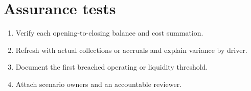 \documentclass[11pt]{article}
\begin{document}
\section{Assurance tests}
\begin{enumerate}[leftmargin=*,itemsep=5pt]
\item Verify each opening-to-closing balance and cost summation.
\item Refresh with actual collections or accruals and explain variance by driver.
\item Document the first breached operating or liquidity threshold.
\item Attach scenario owners and an accountable reviewer.
\end{enumerate}
\end{document}
